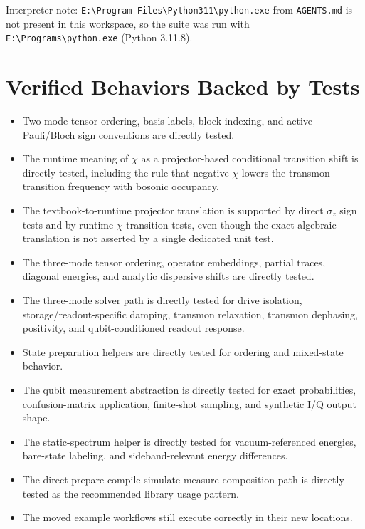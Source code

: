 \documentclass[11pt]{article}
\begin{document}
\noindent
Interpreter note:
\verb|E:\Program Files\Python311\python.exe| from \texttt{AGENTS.md} is not present
in this workspace, so the suite was run with \verb|E:\Programs\python.exe|
(Python 3.11.8).

\section{Verified Behaviors Backed by Tests}
\begin{itemize}[leftmargin=1.5em]
  \item Two-mode tensor ordering, basis labels, block indexing, and active
  Pauli/Bloch sign conventions are directly tested.
  \item The runtime meaning of \(\chi\) as a projector-based conditional transition
  shift is directly tested, including the rule that negative \(\chi\) lowers the
  transmon transition frequency with bosonic occupancy.
  \item The textbook-to-runtime projector translation is supported by direct
  \(\sigma_z\) sign tests and by runtime \(\chi\) transition tests, even though the
  exact algebraic translation is not asserted by a single dedicated unit test.
  \item The three-mode tensor ordering, operator embeddings, partial traces,
  diagonal energies, and analytic dispersive shifts are directly tested.
  \item The three-mode solver path is directly tested for drive isolation,
  storage/readout-specific damping, transmon relaxation, transmon dephasing,
  positivity, and qubit-conditioned readout response.
  \item State preparation helpers are directly tested for ordering and mixed-state behavior.
  \item The qubit measurement abstraction is directly tested for exact
  probabilities, confusion-matrix application, finite-shot sampling, and synthetic I/Q output shape.
  \item The static-spectrum helper is directly tested for vacuum-referenced
  energies, bare-state labeling, and sideband-relevant energy differences.
  \item The direct prepare-compile-simulate-measure composition path is directly
  tested as the recommended library usage pattern.
  \item The moved example workflows still execute correctly in their new locations.
\end{itemize}
\end{document}
